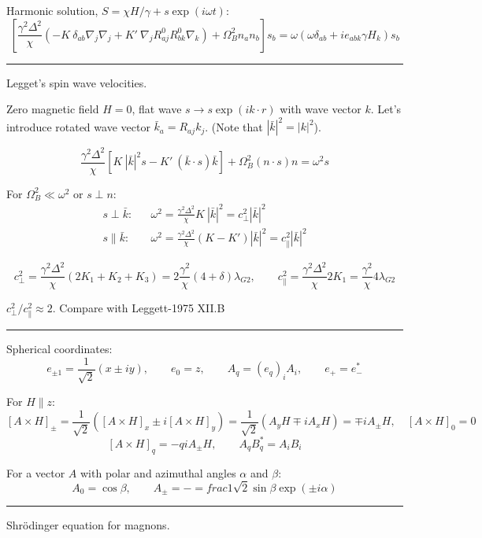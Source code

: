 \documentclass[a4paper]{article}
\begin{document}
Harmonic solution, $S = \chi H/\gamma + s \exp(i\omega t)$:
$$
\left[
\frac{\gamma^2\Delta^2}{\chi}
  (-K\ \delta_{ab} \nabla_j\nabla_j
 + K'\ \nabla_j R^0_{aj}R^0_{bk}\nabla_k)
+ {\Omega_B^2} n_a n_b
\right] s_b =
\omega (\omega \delta_{ab} + i e_{abk} \gamma H_k ) s_b
$$

\eject
\hrule
\medskip

Legget's spin wave velocities.

Zero magnetic field $H=0$, flat wave $s\rightarrow s\exp(i k\cdot r)$ with
wave vector $k$.
Let's introduce rotated wave vector $\bar k_a = R_{aj} k_j$. (Note that
$|\bar k|^2 = |k|^2$).

$$
\frac{\gamma^2\Delta^2}{\chi}
  [K\ |\bar k|^2 s - K'\ (\bar k \cdot s)\bar k]
+ \Omega_B^2 (n\cdot s)n
= \omega^2 s
$$

For $\Omega_B^2 \ll \omega^2$ or $s \perp n$:
\begin{eqnarray*}
s \perp \bar k:
&&
\omega^2
= \frac{\gamma^2\Delta^2}{\chi} K\ |\bar k|^2
= c_\perp^2 |\bar k|^2
\\
s \parallel \bar k:
&&
\omega^2
= \frac{\gamma^2\Delta^2}{\chi}(K - K')|\bar k|^2
= c_\parallel^2 |\bar k|^2
\end{eqnarray*}

$$
c_\perp^2 = \frac{\gamma^2\Delta^2}{\chi} (2K_1+K_2+K_3)
= 2\frac{\gamma^2}{\chi} (4+\delta)\lambda_{G2},
\qquad
c_\parallel^2 = \frac{\gamma^2\Delta^2}{\chi} 2K_1
= \frac{\gamma^2}{\chi} 4\lambda_{G2}
$$

$ c_\perp^2/c_\parallel^2 \approx 2$.
Compare with Leggett-1975 XII.B

\bigskip
\hrule
\medskip

Spherical coordinates:
$$
e_{\pm1} = \frac{1}{\sqrt2} (x\pm iy),\qquad
e_0 = z,\qquad
A_q = (e_q)_i A_i,\qquad
e_+ = e_-^*
$$

For $H \parallel z$:
$$
[A \times H]_{\pm} = \frac{1}{\sqrt2}([A\times H]_x \pm i[A\times H]_y) =
\frac{1}{\sqrt2}(A_y H \mp i A_x H) = \mp i A_{\pm} H,\quad [A \times H]_0=0
$$
$$
[A \times H]_q = -q i A_{\pm} H,\qquad
A_q B^*_{q} = A_i B_i
$$

For a vector $A$ with polar and azimuthal angles $\alpha$ and $\beta$:
$$
A_0 = \cos\beta,\qquad
A_\pm = -=frac{1}{\sqrt2}\sin\beta\exp(\pm i\alpha)
$$

\eject
\hrule
\medskip

Shr\"odinger equation for magnons.
\end{document}
